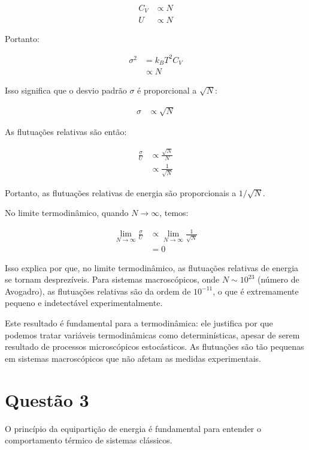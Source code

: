 \documentclass[fleqn,a4paper]{article}
\begin{document}
\begin{align}
C_V &\propto N \\
U &\propto N
\end{align}

Portanto:

\begin{align}
\sigma^2 &= k_B T^2 C_V \\
&\propto N
\end{align}

Isso significa que o desvio padrão $\sigma$ é proporcional a $\sqrt{N}$:

\begin{align}
\sigma &\propto \sqrt{N}
\end{align}

As flutuações relativas são então:

\begin{align}
\frac{\sigma}{U} &\propto \frac{\sqrt{N}}{N} \\
&\propto \frac{1}{\sqrt{N}}
\end{align}

Portanto, as flutuações relativas de energia são proporcionais a $1/\sqrt{N}$.

No limite termodinâmico, quando $N \to \infty$, temos:

\begin{align}
\lim_{N \to \infty} \frac{\sigma}{U} &\propto \lim_{N \to \infty} \frac{1}{\sqrt{N}} \\
&= 0
\end{align}

Isso explica por que, no limite termodinâmico, as flutuações relativas de energia se tornam desprezíveis. Para sistemas macroscópicos, onde $N \sim 10^{23}$ (número de Avogadro), as flutuações relativas são da ordem de $10^{-11}$, o que é extremamente pequeno e indetectável experimentalmente.

Este resultado é fundamental para a termodinâmica: ele justifica por que podemos tratar variáveis termodinâmicas como determinísticas, apesar de serem resultado de processos microscópicos estocásticos. As flutuações são tão pequenas em sistemas macroscópicos que não afetam as medidas experimentais.

\section*{Questão 3}
O princípio da equipartição de energia é fundamental para entender o comportamento térmico de sistemas clássicos.
\end{document}
